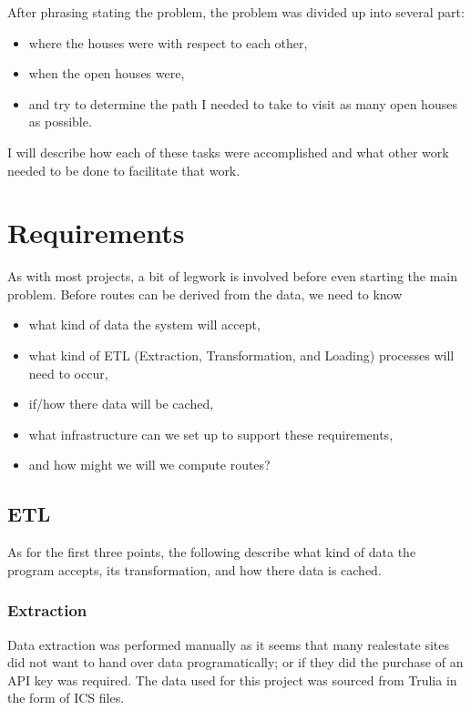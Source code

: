 \documentclass[letterpaper,11pt]{report}
\theoremstyle{definition}
\theoremstyle{definition}
\begin{document}
After phrasing stating the problem, the problem was divided up into several part:
\begin{itemize}
  \item where the houses were with respect to each other,
  \item when the open houses were,
  \item and try to determine the path I needed to take to visit as many open houses as possible.
\end{itemize}

I will describe how each of these tasks were accomplished and what other work needed to be done to facilitate that work.


\section{Requirements}
As with most projects, a bit of legwork is involved before even starting the main problem. Before routes can be derived from the data, we need to know
\begin{itemize}
  \item what kind of data the system will accept,
  \item what kind of ETL (Extraction, Transformation, and Loading) processes will need to occur,
  \item if/how there data will be cached,
  \item what infrastructure can we set up to support these requirements,
  \item and how might we will we compute routes?
\end{itemize}

\subsection{ETL}
As for the first three points, the following describe what kind of data the program accepts, its transformation, and how there data is cached.

\subsubsection{Extraction}\label{E}
Data extraction was performed manually as it seems that many realestate sites did not want to hand over data programatically; or if they did the purchase of an API key was required. The data used for this project was sourced from Trulia\cite{Trulia} in the form of ICS files\cite{ICS}.
\end{document}
